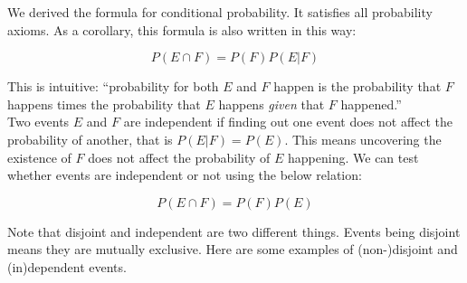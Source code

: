 We derived the formula for conditional probability. It satisfies all probability axioms. As a corollary, this formula is also written in this way:

$$P(E \cap F)=P(F)P(E|F)$$

This is intuitive: ``probability for both $E$ and $F$ happen is the probability that $F$ happens times the probability that $E$ happens \textit{given} that $F$ happened.'' \\

Two events $E$ and $F$ are independent if finding out one event does not affect the probability of another, that is $P(E|F)=P(E)$. This means uncovering the existence of $F$ does not affect the probability of $E$ happening. We can test whether events are independent or not using the below relation:

$$P(E \cap F)=P(F)P(E)$$

Note that disjoint and independent are two different things. Events being disjoint means they are mutually exclusive. Here are some examples of (non-)disjoint and (in)dependent events.

